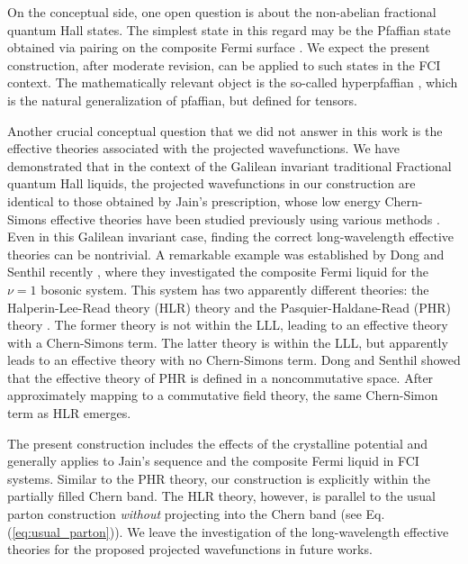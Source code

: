 On the conceptual side, one open question is about the non-abelian fractional quantum Hall states. The simplest state in this regard may be the Pfaffian state obtained via pairing on the composite Fermi surface \cite{moore1991nonabelions,lee2007particle,levin2007particle,son2015composite,read2000paired}. We expect the present construction, after moderate revision, can be applied to such states in the FCI context. The mathematically relevant object is the so-called hyperpfaffian \cite{aboud2016hyperpfaffians}, which is the natural generalization of pfaffian, but defined for tensors.

Another crucial conceptual question that we did not answer in this work is the effective theories associated with the projected wavefunctions. We have demonstrated that in the context of the Galilean invariant traditional Fractional quantum Hall liquids, the projected wavefunctions in our construction are identical to those obtained by Jain's prescription, whose low energy Chern-Simons effective theories have been studied previously using various methods \cite{lopez1991fractional,zhang1992chern,lu2016classification,gromov2015framing,gromov2017bimetric,geracie2015spacetime,sohal2018chern,wen1999projective,barkeshli2010effective}. Even in this Galilean invariant case, finding the correct long-wavelength effective theories can be nontrivial. A remarkable example was established by Dong and Senthil recently \cite{dong2020noncommutative}, where they investigated the composite Fermi liquid for the $\nu=1$ bosonic system. This system has two apparently different theories: the Halperin-Lee-Read theory (HLR) theory \cite{halperin1993theory} and the Pasquier-Haldane-Read (PHR) theory \cite{pasquier1998dipole,read1998lowest}. The former theory is not within the LLL, leading to an effective theory with a Chern-Simons term. The latter theory is within the LLL, but apparently leads to an effective theory with no Chern-Simons term. Dong and Senthil showed that the effective theory of PHR is defined in a noncommutative space. After approximately mapping to a commutative field theory, the same Chern-Simon term as HLR emerges.

The present construction includes the effects of the crystalline potential and generally applies to Jain's sequence and the composite Fermi liquid in FCI systems. Similar to the PHR theory, our construction is explicitly within the partially filled Chern band. The HLR theory, however, is parallel to the usual parton construction \emph{without} projecting into the Chern band (see Eq.(\ref{eq:usual_parton})). We leave the investigation of the long-wavelength effective theories for the proposed projected wavefunctions in future works.


